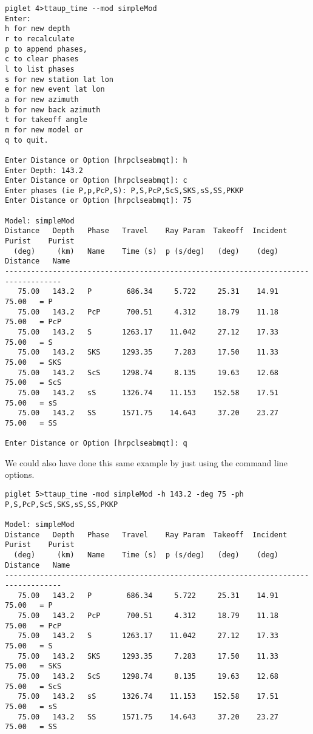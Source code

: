 \begin{verbatim}
piglet 4>ttaup_time --mod simpleMod
Enter:
h for new depth
r to recalculate
p to append phases, 
c to clear phases
l to list phases
s for new station lat lon
e for new event lat lon
a for new azimuth
b for new back azimuth
t for takeoff angle
m for new model or 
q to quit.

Enter Distance or Option [hrpclseabmqt]: h
Enter Depth: 143.2
Enter Distance or Option [hrpclseabmqt]: c
Enter phases (ie P,p,PcP,S): P,S,PcP,ScS,SKS,sS,SS,PKKP
Enter Distance or Option [hrpclseabmqt]: 75

Model: simpleMod
Distance   Depth   Phase   Travel    Ray Param  Takeoff  Incident  Purist    Purist
  (deg)     (km)   Name    Time (s)  p (s/deg)   (deg)    (deg)   Distance   Name 
-----------------------------------------------------------------------------------
   75.00   143.2   P        686.34     5.722     25.31    14.91    75.00   = P    
   75.00   143.2   PcP      700.51     4.312     18.79    11.18    75.00   = PcP  
   75.00   143.2   S       1263.17    11.042     27.12    17.33    75.00   = S    
   75.00   143.2   SKS     1293.35     7.283     17.50    11.33    75.00   = SKS  
   75.00   143.2   ScS     1298.74     8.135     19.63    12.68    75.00   = ScS  
   75.00   143.2   sS      1326.74    11.153    152.58    17.51    75.00   = sS   
   75.00   143.2   SS      1571.75    14.643     37.20    23.27    75.00   = SS   

Enter Distance or Option [hrpclseabmqt]: q
\end{verbatim}

We could also have done this same example by just using the command line
options.

\begin{verbatim}
piglet 5>ttaup_time -mod simpleMod -h 143.2 -deg 75 -ph P,S,PcP,ScS,SKS,sS,SS,PKKP

Model: simpleMod
Distance   Depth   Phase   Travel    Ray Param  Takeoff  Incident  Purist    Purist
  (deg)     (km)   Name    Time (s)  p (s/deg)   (deg)    (deg)   Distance   Name 
-----------------------------------------------------------------------------------
   75.00   143.2   P        686.34     5.722     25.31    14.91    75.00   = P    
   75.00   143.2   PcP      700.51     4.312     18.79    11.18    75.00   = PcP  
   75.00   143.2   S       1263.17    11.042     27.12    17.33    75.00   = S    
   75.00   143.2   SKS     1293.35     7.283     17.50    11.33    75.00   = SKS  
   75.00   143.2   ScS     1298.74     8.135     19.63    12.68    75.00   = ScS  
   75.00   143.2   sS      1326.74    11.153    152.58    17.51    75.00   = sS   
   75.00   143.2   SS      1571.75    14.643     37.20    23.27    75.00   = SS   
\end{verbatim}

